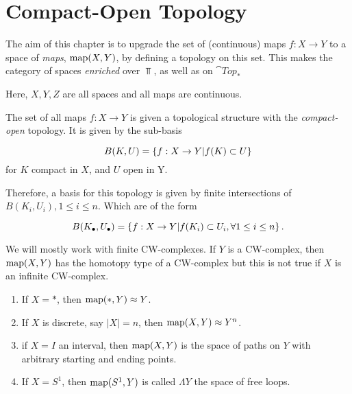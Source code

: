 \documentclass[main.tex]{subfiles}
\begin{document}
\chapter{Compact-Open Topology}
\setcounter{section}{1}

The aim of this chapter is to upgrade the set of (continuous) maps \(f: X \to Y\) to a space of \emph{maps}, \(\operatorname{map}(X,Y)\), by defining a topology on this set.
This makes the category of spaces \emph{enriched} over \(\Top\), as well as on \(\cat{Top_*}\)

\begin{rem}
	Here, \(X, Y, Z\) are all spaces and all maps are continuous.
\end{rem}

\begin{defn}
	The set of all maps \(f: X \to Y\) is given a topological structure with the \emph{compact-open} topology.
	It is given by the sub-basis


\[
		B(K, U) = \mset{f: X \to Y | f(K) \subset U}

\]
	for \(K\) compact in \(X\), and \(U\) open in Y.
\end{defn}

\begin{rem}
	Therefore, a basis for this topology is given by finite intersections of \(B(K_i, U_i), 1 \leq i \leq n\).
	Which are of the form


\[
		B(K_\bullet, U_\bullet) = \mset{f: X \to Y | f(K_i) \subset U_i, \forall 1 \leq i \leq n}.

\]
\end{rem}

\begin{rem}
	We will mostly work with finite CW-complexes.
	If \(Y\) is a CW-complex, then \(\operatorname{map}(X,Y)\) has the homotopy type of a CW-complex but this is not true if \(X\) is an infinite CW-complex.

\end{rem}

\begin{example}


\begin{enumerate}
		\item If \(X = \ast\), then \(\operatorname{map}(\ast, Y) \approx Y\).
		\item If \(X\) is discrete, say \(|X| = n\), then \(\operatorname{map}(X,Y) \approx Y^n \).
		\item if \(X = I\) an interval, then \(\operatorname{map}(X,Y)\) is the space of paths on \(Y\) with arbitrary starting and ending points.
		\item If \(X = S^1 \), then \(\operatorname{map}(S^1, Y)\) is called \(\Lambda Y\) the space of free loops.


\end{enumerate}
\end{example}
\end{document}
